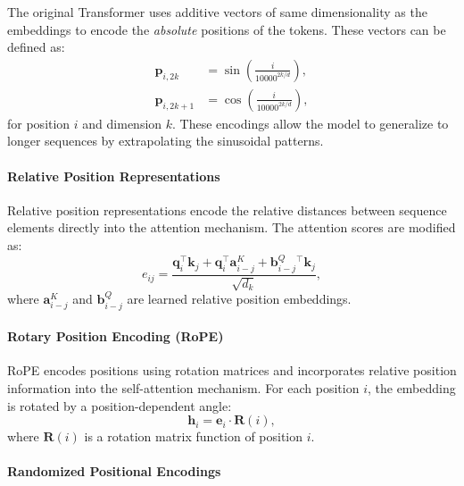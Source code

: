 The original Transformer \parencite{vaswani_attention_2017} uses additive vectors of same dimensionality as the embeddings to encode the \emph{absolute} positions of the tokens. These vectors can be defined as:
\begin{align*}
    \mathbf{p}_{i,2k}   & = \sin\left( \frac{i}{10000^{2k/d}} \right), \\
    \mathbf{p}_{i,2k+1} & = \cos\left( \frac{i}{10000^{2k/d}} \right),
\end{align*}
for position $i$ and dimension $k$. These encodings allow the model to generalize to longer sequences by extrapolating the sinusoidal patterns.

\paragraph{Relative Position Representations}\label{subsec:relative_pos_rep}


Relative position representations \cite{shaw_self-attention_2018} encode the relative distances between sequence elements directly into the attention mechanism. The attention scores are modified as:
\begin{equation*}
    e_{ij} = \frac{\mathbf{q}_i^\top \mathbf{k}_j + \mathbf{q}_i^\top \mathbf{a}_{i-j}^K + \mathbf{b}_{i-j}^Q{}^\top \mathbf{k}_j}{\sqrt{d_k}},
\end{equation*}
where $\mathbf{a}_{i-j}^K$ and $\mathbf{b}_{i-j}^Q$ are learned relative position embeddings.

\paragraph{Rotary Position Encoding (RoPE)}\label{subsec:rope}

RoPE \cite{su_roformer_2024} encodes positions using rotation matrices and incorporates relative position information into the self-attention mechanism. For each position $i$, the embedding is rotated by a position-dependent angle:
\begin{equation*}
    \mathbf{h}_i = \mathbf{e}_i \cdot \mathbf{R}(i),
\end{equation*}
where $\mathbf{R}(i)$ is a rotation matrix function of position $i$.

\paragraph{Randomized Positional Encodings}\label{subsec:random_pos_enc}

